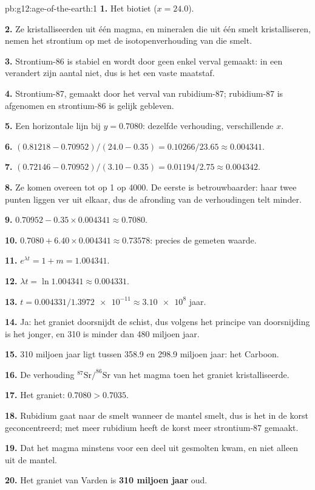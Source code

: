\begin{solution}{pb:g12:age-of-the-earth:1}
\textbf{1.} Het biotiet ($x = 24.0$).

\textbf{2.} Ze kristalliseerden uit één magma, en mineralen die uit één smelt
kristalliseren, nemen het strontium op met de isotopenverhouding van die smelt.

\textbf{3.} Strontium-86 is stabiel en wordt door geen enkel verval gemaakt: in een 
verandert zijn aantal niet, dus is het een vaste maatstaf.

\textbf{4.} Strontium-87, gemaakt door het verval van rubidium-87; rubidium-87 is
afgenomen en strontium-86 is gelijk gebleven.

\textbf{5.} Een horizontale lijn bij $y = 0.7080$: dezelfde verhouding, verschillende $x$.

\textbf{6.} $(0.81218 - 0.70952)/(24.0 - 0.35) = 0.10266/23.65 \approx
0.004341$.

\textbf{7.} $(0.72146 - 0.70952)/(3.10 - 0.35) = 0.01194/2.75 \approx
0.004342$.

\textbf{8.} Ze komen overeen tot op 1 op 4000. De eerste is betrouwbaarder:
haar twee punten liggen ver uit elkaar, dus de afronding van de verhoudingen telt minder.

\textbf{9.} $0.70952 - 0.35 \times 0.004341 \approx 0.7080$.

\textbf{10.} $0.7080 + 6.40 \times 0.004341 \approx 0.73578$: precies de
gemeten waarde.

\textbf{11.} $e^{\lambda t} = 1 + m = 1.004341$.

\textbf{12.} $\lambda t = \ln 1.004341 \approx 0.004331$.

\textbf{13.} $t = 0.004331/\num{1.3972e-11} \approx \num{3.10e8}$ jaar.

\textbf{14.} Ja: het graniet doorsnijdt de schist, dus volgens het principe van
doorsnijding is het jonger, en 310 is minder dan 480 miljoen
jaar.

\textbf{15.} 310 miljoen jaar ligt tussen 358.9 en 298.9 miljoen jaar:
het Carboon.

\textbf{16.} De verhouding $^{87}\mathrm{Sr}/^{86}\mathrm{Sr}$ van het magma toen
het graniet kristalliseerde.

\textbf{17.} Het graniet: $0.7080 > 0.7035$.

\textbf{18.} Rubidium gaat naar de smelt wanneer de mantel smelt, dus is het
in de korst geconcentreerd; met meer rubidium heeft de korst meer
strontium-87 gemaakt.

\textbf{19.} Dat het magma minstens voor een deel uit gesmolten  kwam, en niet alleen uit de mantel.

\textbf{20.} Het graniet van Varden is \textbf{310 miljoen jaar} oud.
\end{solution}
